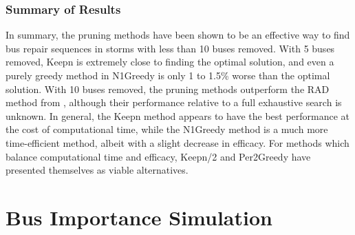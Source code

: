 \documentclass[12pt]{article}
\begin{document}
\subsubsection{Summary of Results}
In summary, the pruning methods have been shown to be an effective way to find bus repair sequences in storms with less than 10 buses removed. With 5 buses removed, Keepn is extremely close to finding the optimal solution, and even a purely greedy method in N1Greedy is only 1 to 1.5\% worse than the optimal solution. With 10 buses removed, the pruning methods outperform the RAD method from \cite{coffrin2012}, although their performance relative to a full exhaustive search is unknown. In general, the Keepn method appears to have the best performance at the cost of computational time, while the N1Greedy method is a much more time-efficient method, albeit with a slight decrease in efficacy. For methods which balance computational time and efficacy, Keepn/2 and Per2Greedy have presented themselves as viable alternatives.
\newpage

\section{Bus Importance Simulation}
\end{document}
